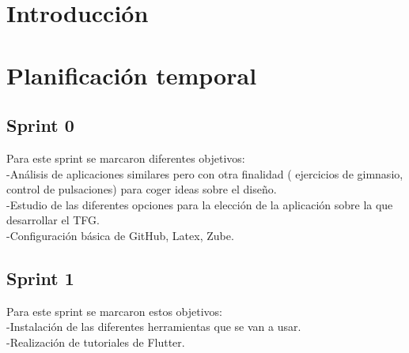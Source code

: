 
\section{Introducción}

\section{Planificación temporal}

\subsection{Sprint 0}

Para este sprint se marcaron diferentes objetivos:\\
-Análisis de aplicaciones similares pero con otra finalidad ( ejercicios de gimnasio, control de pulsaciones) para coger ideas sobre el diseño.\\
-Estudio de las diferentes opciones para la elección de la aplicación sobre la que desarrollar el TFG.\\
-Configuración básica de GitHub, Latex, Zube.

\subsection{Sprint 1}

Para este sprint se marcaron estos objetivos:\\
-Instalación de las diferentes herramientas que se van a usar.\\
-Realización de tutoriales de Flutter.